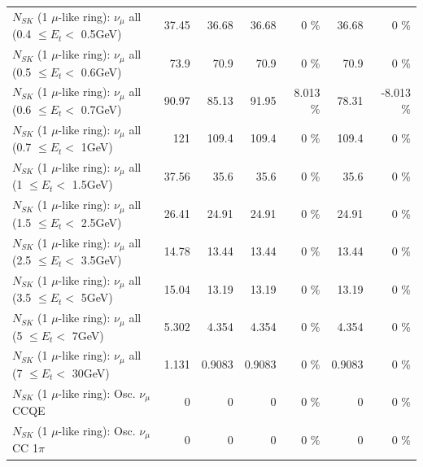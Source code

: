 \begin{table}
\begin{tabular}{| l | r | r | r  r | r  r |}
       $N_{SK}$ (1 $\mu$-like ring): $\nu_{\mu}$ all (0.4 $\leq E_{t} <$ 0.5GeV) &           37.45 &           36.68 &           36.68 &        0 \%  &           36.68 &        0 \%  \\ 
       $N_{SK}$ (1 $\mu$-like ring): $\nu_{\mu}$ all (0.5 $\leq E_{t} <$ 0.6GeV) &            73.9 &            70.9 &            70.9 &        0 \%  &            70.9 &        0 \%  \\ 
       $N_{SK}$ (1 $\mu$-like ring): $\nu_{\mu}$ all (0.6 $\leq E_{t} <$ 0.7GeV) &           90.97 &           85.13 &           91.95 &    8.013 \%  &           78.31 &   -8.013 \%  \\ 
         $N_{SK}$ (1 $\mu$-like ring): $\nu_{\mu}$ all (0.7 $\leq E_{t} <$ 1GeV) &             121 &           109.4 &           109.4 &        0 \%  &           109.4 &        0 \%  \\ 
         $N_{SK}$ (1 $\mu$-like ring): $\nu_{\mu}$ all (1 $\leq E_{t} <$ 1.5GeV) &           37.56 &            35.6 &            35.6 &        0 \%  &            35.6 &        0 \%  \\ 
       $N_{SK}$ (1 $\mu$-like ring): $\nu_{\mu}$ all (1.5 $\leq E_{t} <$ 2.5GeV) &           26.41 &           24.91 &           24.91 &        0 \%  &           24.91 &        0 \%  \\ 
       $N_{SK}$ (1 $\mu$-like ring): $\nu_{\mu}$ all (2.5 $\leq E_{t} <$ 3.5GeV) &           14.78 &           13.44 &           13.44 &        0 \%  &           13.44 &        0 \%  \\ 
         $N_{SK}$ (1 $\mu$-like ring): $\nu_{\mu}$ all (3.5 $\leq E_{t} <$ 5GeV) &           15.04 &           13.19 &           13.19 &        0 \%  &           13.19 &        0 \%  \\ 
           $N_{SK}$ (1 $\mu$-like ring): $\nu_{\mu}$ all (5 $\leq E_{t} <$ 7GeV) &           5.302 &           4.354 &           4.354 &        0 \%  &           4.354 &        0 \%  \\ 
          $N_{SK}$ (1 $\mu$-like ring): $\nu_{\mu}$ all (7 $\leq E_{t} <$ 30GeV) &           1.131 &          0.9083 &          0.9083 &        0 \%  &          0.9083 &        0 \%  \\ 
\hline
\hline
                               $N_{SK}$ (1 $\mu$-like ring): Osc. $\nu_\mu$ CCQE &               0 &               0 &               0 &        0 \%  &               0 &        0 \%  \\ 
                          $N_{SK}$ (1 $\mu$-like ring): Osc. $\nu_\mu$ CC 1$\pi$ &               0 &               0 &               0 &        0 \%  &               0 &        0 \%  \\ 

\end{tabular}
\end{table}

